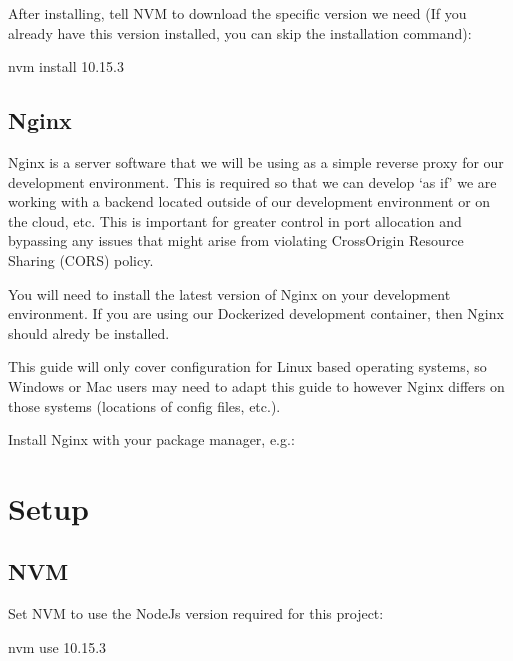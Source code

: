 \documentclass[letterpaper,10pt,english]{sphinxmanual}
\begin{document}
\sphinxAtStartPar
After installing, tell NVM to download the specific version we need (If you already have this version installed, you can skip the installation command):
\begin{sphinxalltt}
nvm install 10.15.3
\end{sphinxalltt}


\section{Nginx}
\label{\detokenize{install:nginx}}
\sphinxAtStartPar
{}

\sphinxAtStartPar
Nginx is a server software that we will be using as a simple reverse proxy for our development environment. This is required so that we can develop ‘as if’ we are working with a backend located outside of our development environment or on the cloud, etc. This is important for greater control in port allocation and bypassing any issues that might arise from violating Cross\sphinxhyphen{}Origin Resource Sharing (CORS) policy.

\sphinxAtStartPar
You will need to install the latest version of Nginx on your development environment. If you are using our Dockerized development container, then Nginx should alredy be installed.

\sphinxAtStartPar
This guide will only cover configuration for Linux based operating systems, so Windows or Mac users may need to adapt this guide to however Nginx differs on those systems (locations of config files, etc.).

\sphinxAtStartPar
Install Nginx with your package manager, e.g.:

\begin{sphinxVerbatim}[commandchars=\\\{\}]
   
\end{sphinxVerbatim}

\sphinxstepscope


\chapter{Setup}
\label{\detokenize{setup:setup}}\label{\detokenize{setup::doc}}

\section{NVM}
\label{\detokenize{setup:nvm}}
\sphinxAtStartPar
Set NVM to use the NodeJs version required for this project:
\begin{sphinxalltt}
nvm use 10.15.3
\end{sphinxalltt}
\end{document}
